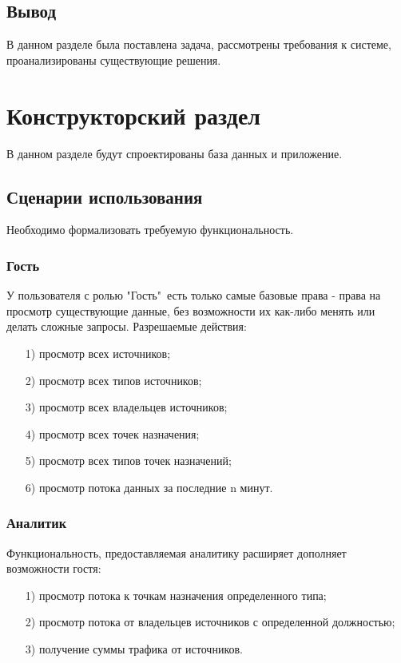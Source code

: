 \subsection{Вывод}
В данном разделе была поставлена задача, рассмотрены требования к системе, проанализированы существующие решения.


\clearpage
\section{Конструкторский раздел}
В данном разделе будут спроектированы база данных и приложение.


\subsection{Сценарии использования}
Необходимо формализовать требуемую функциональность. 
\subsubsection{Гость}
У пользователя с ролью "Гость"\ есть только самые базовые права - права на просмотр существующие данные, без возможности их как-либо менять или делать сложные запросы.
Разрешаемые действия:
\begin{itemize}
	\item[1)] просмотр всех источников;
	\item[2)] просмотр всех типов источников;
	\item[3)] просмотр всех владельцев источников;
	\item[4)] просмотр всех точек назначения;
	\item[5)] просмотр всех типов точек назначений;
	\item[6)] просмотр потока данных за последние n минут.
\end{itemize}

\subsubsection{Аналитик}
Функциональность, предоставляемая аналитику расширяет дополняет возможности гостя:
\begin{itemize}
	\item[1)] просмотр потока к точкам назначения определенного типа;
	\item[2)] просмотр потока от владельцев источников с определенной должностью;
	\item[3)] получение суммы трафика от источников.
\end{itemize}
